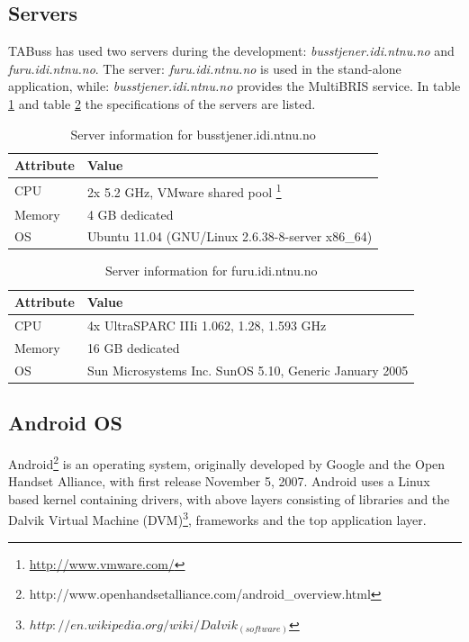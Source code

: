 \subsection{Servers}
TABuss has used two servers during the development: \emph{busstjener.idi.ntnu.no} and \emph{furu.idi.ntnu.no}. The server: \emph{furu.idi.ntnu.no} is used in the stand-alone application, while: \emph{busstjener.idi.ntnu.no} provides the MultiBRIS service. In table \ref{tab:busstjenerSpecs} and table \ref{tab:furuSpecs} the specifications of the servers are listed.

\begin{table}[h!]
\caption{Server information for busstjener.idi.ntnu.no\label{tab:busstjenerSpecs}}
\centering
\begin{tabular}{| p{} | p{} |}
\hline
 \textbf{Attribute } &   \textbf{Value} \\
\hline
CPU & 2x 5.2 GHz, VMware shared pool \footnote{\url{http://www.vmware.com/}}	\\
\hline
Memory & 4 GB dedicated \\
\hline
OS & Ubuntu 11.04 (GNU/Linux 2.6.38-8-server x86\_64) \\
\hline
\end{tabular}
\end{table}


\begin{table}[h!]
\caption{Server information for furu.idi.ntnu.no\label{tab:furuSpecs}}
\centering
\begin{tabular}{| p{} | p{} |}
\hline
 \textbf{Attribute } &   \textbf{Value} \\
\hline
CPU & 4x UltraSPARC IIIi 1.062, 1.28, 1.593 GHz \\
\hline
Memory & 16 GB dedicated \\
\hline
OS & Sun Microsystems Inc. SunOS 5.10, Generic January 2005 \\
\hline
\end{tabular}
\end{table}

\subsection {Android OS}
Android\footnote{http://www.openhandsetalliance.com/android\_overview.html} is an operating system, originally developed by Google and the Open Handset Alliance, with first release November 5, 2007. Android uses a Linux based kernel containing drivers, with above layers consisting of libraries and the Dalvik Virtual Machine (DVM)\footnote{$http://en.wikipedia.org/wiki/Dalvik_(software)$}, frameworks and the top application layer. 

